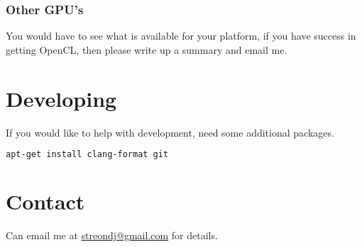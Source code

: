 \documentclass[12pt]{report}
\begin{document}
\subsubsection{Other GPU's}
You would have to see what is available for your platform,
if you have success in getting OpenCL, then please write up a summary and email
me.

\section{Developing}

If you would like to help with development, need some additional packages.
\begin{lstlisting}[language=bash]
apt-get install clang-format git
\end{lstlisting}

\section{Contact}
Can email me at \href{mailto:streondj@gmail.com}{streondj@gmail.com}
for details.
\printbibliography
\end{document}
